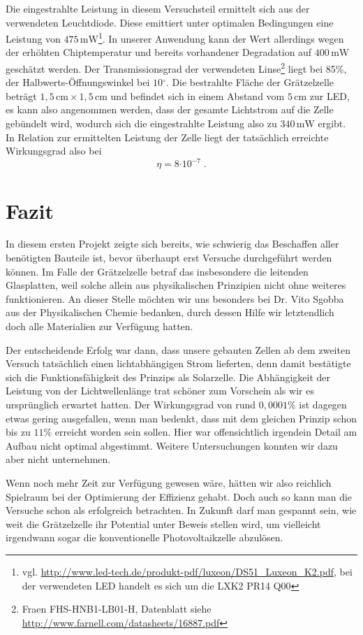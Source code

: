 \documentclass[11pt]{scrartcl}
\newcommand{\unit}[1]{\ensuremath{\,\mathrm{#1}}} %
\newcommand{\degr}{\ensuremath{^\circ}}
\newcommand{\ee}[1]{\ensuremath{\cdot 10^{#1}}}
\begin{document}
Die eingestrahlte Leistung in diesem Versuchsteil ermittelt sich aus der verwendeten Leuchtdiode.
Diese emittiert unter optimalen Bedingungen eine Leistung von $475 \unit{mW}$\footnote{vgl. \url{http://www.led-tech.de/produkt-pdf/luxeon/DS51\_Luxeon\_K2.pdf}, bei der verwendeten LED handelt es sich um die LXK2 PR14 Q00}. In unserer Anwendung kann der Wert allerdings wegen der erhöhten Chiptemperatur und bereits vorhandener Degradation auf $400 \unit{mW}$ geschätzt werden.
Der Transmissionsgrad der verwendeten Linse\footnote{Fraen FHS-HNB1-LB01-H, Datenblatt siehe \url{http://www.farnell.com/datasheets/16887.pdf}} liegt bei 85\%, der Halbwerts-Öffnungswinkel bei $10\degr$.
Die bestrahlte Fläche der Grätzelzelle beträgt $1,5 \unit{cm} \times 1,5 \unit{cm}$ und befindet sich in einem Abstand vom $5 \unit{cm}$ zur LED, es kann also angenommen werden, dass der gesamte Lichtstrom auf die Zelle gebündelt wird, wodurch sich die eingestrahlte Leistung also zu $340 \unit{mW}$ ergibt.
In Relation zur ermittelten Leistung der Zelle liegt der tatsächlich erreichte Wirkungsgrad also bei
\[
\boxed{\eta = 8 \ee{-7}} \;.
\]





\section{Fazit}
In diesem ersten Projekt zeigte sich bereits, wie schwierig das Beschaffen aller benötigten Bauteile ist, bevor überhaupt erst Versuche durchgeführt werden können.
Im Falle der Grätzelzelle betraf das insbesondere die leitenden Glasplatten, weil solche allein aus physikalischen Prinzipien nicht ohne weiteres funktionieren.
An dieser Stelle möchten wir uns besonders bei Dr. Vito Sgobba aus der Physikalischen Chemie bedanken, durch dessen Hilfe wir letztendlich doch alle Materialien zur Verfügung hatten.

Der entscheidende Erfolg war dann, dass unsere gebauten Zellen ab dem zweiten Versuch tatsächlich einen lichtabhängigen Strom lieferten, denn damit bestätigte sich die Funktionsfähigkeit des Prinzips als Solarzelle.
Die Abhängigkeit der Leistung von der Lichtwellenlänge trat schöner zum Vorschein als wir es ursprünglich erwartet hatten.
Der Wirkungsgrad von rund $0,0001\%$ ist dagegen etwas gering ausgefallen, wenn man bedenkt, dass mit dem gleichen Prinzip schon bis zu $11\%$ erreicht worden sein sollen.
Hier war offensichtlich irgendein Detail am Aufbau nicht optimal abgestimmt.
Weitere Untersuchungen konnten wir dazu aber nicht unternehmen.

Wenn noch mehr Zeit zur Verfügung gewesen wäre, hätten wir also reichlich Spielraum bei der Optimierung der Effizienz gehabt. Doch auch so kann man die Versuche schon als erfolgreich betrachten. In Zukunft darf man gespannt sein, wie weit die Grätzelzelle ihr Potential unter Beweis stellen wird, um vielleicht irgendwann sogar die konventionelle Photovoltaikzelle abzulösen.
\end{document}
